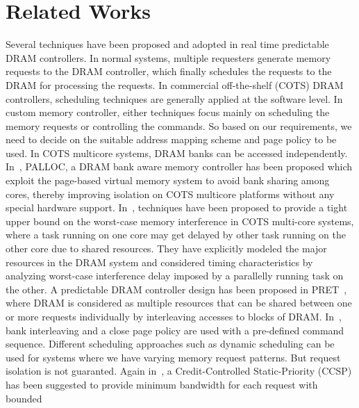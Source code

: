 \section{Related Works} \label{rel}
\noindent
Several techniques have been proposed and adopted in real time predictable DRAM controllers. 
In normal systems, multiple requesters generate memory requests to the DRAM controller, which finally schedules the requests 
to the DRAM for processing the requests. 
In commercial off-the-shelf (COTS) 
DRAM controllers, scheduling techniques are generally applied at the software level. In custom memory controller, either 
techniques focus mainly on scheduling the memory requests or controlling the commands. So based on our requirements, we need 
to decide on the suitable address mapping scheme and page policy to be used. 
In COTS multicore systems, DRAM banks can be accessed independently. 
In~\cite{yun2014palloc}, PALLOC, a DRAM bank aware memory controller has been proposed which exploit the page-based virtual memory system to avoid bank 
sharing among cores, thereby improving isolation on COTS multicore platforms without any special hardware support.
In~\cite{kim2014bounding}, techniques have been proposed to provide a tight upper bound on the worst-case memory interference
in COTS multi-core systems, where a task running on one core may get delayed by other task running on the other core due to 
shared resources. 
They have explicitly modeled the major resources in the DRAM system and considered timing characteristics by 
analyzing worst-case interference delay imposed by a parallelly running task on the other. 
A predictable DRAM controller 
design has been proposed in PRET~\cite{reineke2011pret}, where DRAM is considered as multiple 
resources that can be shared between one or more requests individually by interleaving accesses to blocks of DRAM. 
In~\cite{Akesson11-DATE}, bank interleaving and a close page policy are 
used with a pre-defined command sequence. Different scheduling approaches such as dynamic scheduling can be used for systems 
where we have varying memory request patterns. But request isolation is not guaranted. 
Again in~\cite{akesson2008real}, a 
Credit-Controlled Static-Priority (CCSP) has been suggested to provide minimum bandwidth for each request with bounded 
